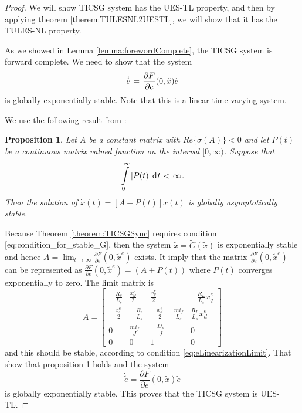 \documentclass[letterpaper, 10 pt, conference]{ieeeconf}
\newtheorem{proposition}[theorem]{Proposition}
\newcommand{\m}      {{\hbox{\hskip 1pt}}}
\newcommand{\dd}     {{\rm d\hbox{\hskip 0.5pt}}}
\begin{document}
\begin{proof}

We will show TICSG system has the UES-TL property, and then by applying theorem \ref{therem:TULESNL2UESTL}, we will show that it has the TULES-NL property.

As we showed in Lemma \ref{lemma:forewordComplete}, the TICSG system
is forward complete. We need to show that the system
$$ \dot{\tilde{e}} \m=\m \frac{\partial F}{\partial e}(0,\tilde{x})
   \tilde{e}$$
is globally exponentially stable. Note that this is a linear time
varying system.

We use the following result from \cite[theorem 4.2.7]
{SchovanecGilliam1999}:

\begin{proposition}\label{proposition:LTVStability}
Let $A$ be a constant matrix with $Re\{\sigma(A)\}<0$ and let $P(t)$
be a continuous matrix valued function on the interval
$[0,\infty)$. Suppose that
$$\intop_0^\infty \left|P(t)\right| \dd t \m<\m \infty \m.$$
Then the solution of $\dot{x}(t)=[A+P(t)]x(t)$ is globally 
asymptotically stable.
\end{proposition}
 
Because Theorem \ref{theorem:TICSGSync} requires condition
\eqref{eq:condition_for_stable_G}, then the system $\tilde{x}=
\tilde{G}(\tilde{x})$ is exponentially stable and hence $A =
\lim_{t \to \infty}\frac{\partial F}{\partial e}(0,\tilde{x}^e)$
exists.  It imply that the matrix $\frac{\partial F}{\partial
e}(0,\tilde{x}^e)$ can be represented as $\frac{\partial F}{\partial
e}(0,\tilde{x}^e) = \left(A+P(t)\right)$ where $P(t)$ converges
exponentially to zero. The limit matrix is
$$
A=\left[\begin{array}{cccc}
-\frac{R_{s}}{L_{s}} & \frac{x^e_{\omega}}{2} & \frac{x^e_{q}}{2} & -\frac{R_{L}}{L_{s}}x^e_{q}\\
-\frac{x^e_{\omega}}{2} & -\frac{R_{s}}{L_{s}} & -\frac{x^e_{d}}{2}-\frac{mi_f}{L_{s}} & \frac{R_{L}}{L_{s}}x^e_{d}\\
0 & \frac{mi_{f}}{J} & -\frac{D_{p}}{J} & 0\\
0 & 0 & 1 & 0
\end{array}\right]
$$
and this should be stable, according to condition
\eqref{eq:eLinearizationLimit}.  That show that proposition
\ref{proposition:LTVStability} holds and the system
$$ \dot{\tilde{e}}=\frac{\partial F}{\partial e}(0,\tilde{x})
   \tilde{e}$$
is globally exponentially stable. This proves that the TICSG system
is UES-TL. 


\end{proof}
\end{document}
